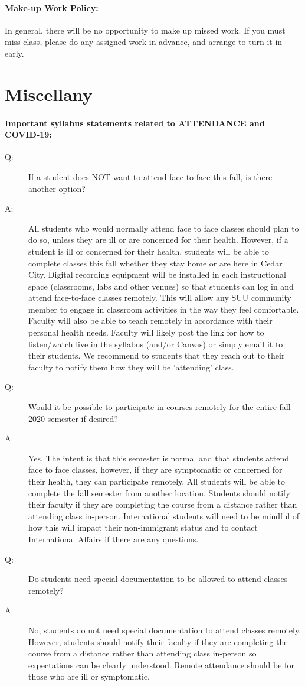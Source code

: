 \documentclass[12pt, letterpaper]{article}
\begin{document}
\paragraph{Make-up Work Policy:}
In general, there will be no opportunity to make up missed work. If you must miss class, please do any assigned work in advance, and arrange to turn it in early.

\section*{Miscellany}
\paragraph{Important syllabus statements related to ATTENDANCE and COVID-19:}
\begin{description}
	\item[Q:~~~~~~] If a student does NOT want to attend face-to-face this fall, is there another option?
	\item[A:~~~~~~] All students who would normally attend face to face classes should plan to do so, unless they are ill or are concerned for their health. However, if a student is ill or concerned for their health, students will be able to complete classes this fall whether they stay home or are here in Cedar City. Digital recording equipment will be installed in each instructional space (classrooms, labs and other venues) so that students can log in and attend face-to-face classes remotely. This will allow any SUU community member to engage in classroom activities in the way they feel comfortable. Faculty will also be able to teach remotely in accordance with their personal health needs. Faculty will likely post the link for how to listen/watch live in the syllabus (and/or Canvas) or simply email it to their students. We recommend to students that they reach out to their faculty to notify them how they will be 'attending' class.
	\item[Q:~~~~~~] Would it be possible to participate in courses remotely for the entire fall 2020 semester if desired?
	\item[A:~~~~~~] Yes. The intent is that this semester is normal and that students attend face to face classes, however, if they are symptomatic or concerned for their health, they can participate remotely. All students will be able to complete the fall semester from another location. Students should notify their faculty if they are completing the course from a distance rather than attending class in-person. International students will need to be mindful of how this will impact their non-immigrant status and to contact International Affairs if there are any questions.
	\item[Q:~~~~~~] Do students need special documentation to be allowed to attend classes remotely?
	\item[A:~~~~~~]  No, students do not need special documentation to attend classes remotely. However, students should notify their faculty if they are completing the course from a distance rather than attending class in-person so expectations can be clearly understood. Remote attendance should be for those who are ill or symptomatic.
\end{description}
\end{document}
